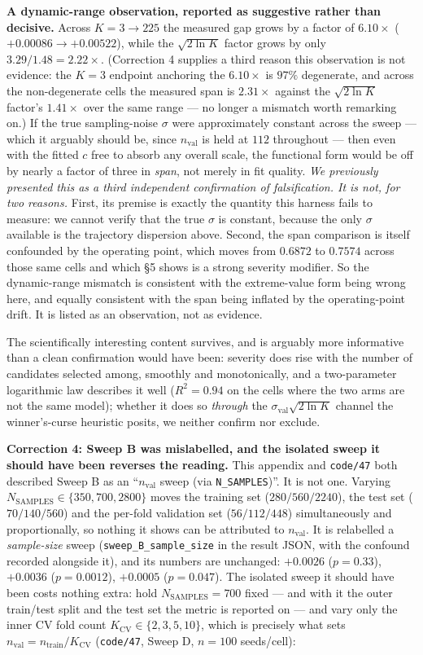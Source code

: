 \documentclass[10pt]{article} %
\begin{document}
\textbf{A dynamic-range observation, reported as suggestive rather than
decisive.} Across $K=3\to225$ the measured gap grows by a factor of
$6.10\times$ ($+0.00086\to+0.00522$), while the $\sqrt{2\ln K}$ factor grows by
only $3.29/1.48=2.22\times$. (Correction 4 supplies a third reason this
observation is not evidence: the $K=3$ endpoint anchoring the $6.10\times$ is
$97\%$ degenerate, and across the non-degenerate cells the measured span is
$2.31\times$ against the $\sqrt{2\ln K}$ factor's $1.41\times$ over the same
range --- no longer a mismatch worth remarking on.) If the true sampling-noise $\sigma$ were
approximately constant across the sweep --- which it arguably should be, since
$n_{\text{val}}$ is held at $112$ throughout --- then even with the fitted $c$
free to absorb any overall scale, the functional form would be off by nearly a
factor of three in \emph{span}, not merely in fit quality. \emph{We previously
presented this as a third independent confirmation of falsification. It is
not, for two reasons.} First, its premise is exactly the quantity this harness
fails to measure: we cannot verify that the true $\sigma$ is constant, because
the only $\sigma$ available is the trajectory dispersion above. Second, the
span comparison is itself confounded by the operating point, which moves from
$0.6872$ to $0.7574$ across those same cells and which §5 shows is a strong
severity modifier. So the dynamic-range mismatch is consistent with the
extreme-value form being wrong here, and equally consistent with the span being
inflated by the operating-point drift. It is listed as an observation, not as
evidence.

The scientifically interesting content survives, and is arguably more
informative than a clean confirmation would have been: severity does rise with
the number of candidates selected among, smoothly and monotonically, and a
two-parameter logarithmic law describes it well ($R^2=0.94$ on the cells where
the two arms are not the same model); whether it
does so \emph{through} the $\sigma_{\text{val}}\sqrt{2\ln K}$ channel the
winner's-curse heuristic posits, we neither confirm nor exclude.

\textbf{Correction 4: Sweep B was mislabelled, and the isolated sweep it should
have been reverses the reading.} This appendix and \texttt{code/47} both
described Sweep B as an ``$n_{\text{val}}$ sweep (via \texttt{N\_SAMPLES})''.
It is not one. Varying $N_{\text{SAMPLES}}\in\{350,700,2800\}$ moves the
training set ($280/560/2240$), the test set ($70/140/560$) and the per-fold
validation set ($56/112/448$) simultaneously and proportionally, so nothing it
shows can be attributed to $n_{\text{val}}$. It is relabelled a
\emph{sample-size} sweep (\texttt{sweep\_B\_sample\_size} in the result JSON,
with the confound recorded alongside it), and its numbers are unchanged:
$+0.0026$ ($p=0.33$), $+0.0036$ ($p=0.0012$), $+0.0005$ ($p=0.047$). The
isolated sweep it should have been costs nothing extra: hold
$N_{\text{SAMPLES}}=700$ fixed --- and with it the outer train/test split and
the test set the metric is reported on --- and vary only the inner CV fold
count $K_{\text{CV}}\in\{2,3,5,10\}$, which is precisely what sets
$n_{\text{val}}=n_{\text{train}}/K_{\text{CV}}$ (\texttt{code/47}, Sweep D,
$n=100$ seeds/cell):
\end{document}
